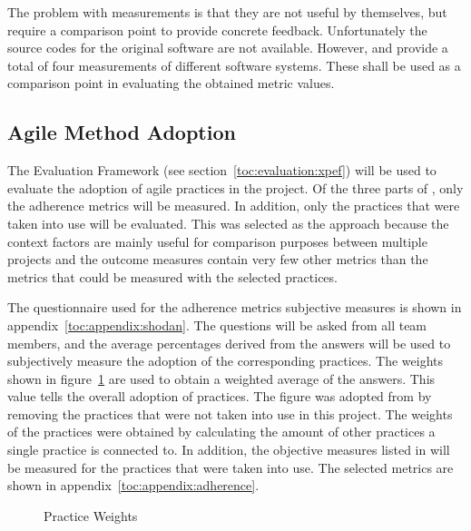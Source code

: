 The problem with measurements is that they are not useful by 
themselves, but require a comparison point to provide concrete 
feedback. Unfortunately the source codes for the original software are 
not available. However, \cite{oodmetrics} and \cite{ckanalysis} 
provide a total of four measurements of different software systems. 
These shall be used as a comparison point in evaluating the obtained 
 metric values.


\subsection{Agile Method Adoption}
\label{toc:selected:evaluation:agileadoption}

The  Evaluation Framework (see 
section~\ref{toc:evaluation:xpef}) will be used to evaluate the 
adoption of agile practices in the project. Of the three parts of 
, only the  adherence metrics will be 
measured. In addition, only the practices that were taken into use 
will be evaluated. This was selected as the approach because the 
 context factors are mainly useful for comparison 
purposes between multiple projects and the  outcome 
measures contain very few other metrics than the  metrics 
that could be measured with the selected  practices.

The questionnaire used for the  adherence metrics 
subjective measures is shown in appendix~\ref{toc:appendix:shodan}. 
The questions will be asked from all team members, and the average 
percentages derived from the answers will be used to subjectively 
measure the adoption of the corresponding practices. The weights shown 
in figure~\ref{fig:xpweights} are used to obtain a weighted average of 
the answers. This value tells the overall adoption of  
practices. The figure was adopted from \citep{xpexplained} by removing 
the practices that were not taken into use in this project. The 
weights of the practices were obtained by calculating the amount of 
other practices a single practice is connected to. In addition, the 
objective measures listed in \citep{xpevaluationfw} will be measured 
for the practices that were taken into use. The selected metrics are 
shown in appendix~\ref{toc:appendix:adherence}.

\begin{figure}
\begin{center}
  \caption{ Practice Weights}
  \label{fig:xpweights}
\end{center}
\end{figure}


